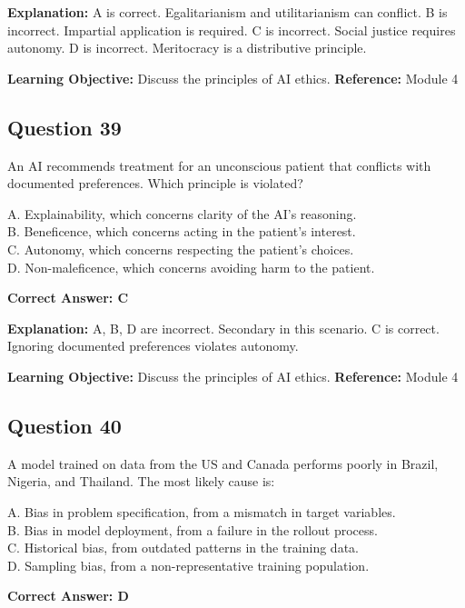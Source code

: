 \documentclass[11pt]{article}
\begin{document}
	\textbf{Explanation:}
	A is correct. Egalitarianism and utilitarianism can conflict.
	B is incorrect. Impartial application is required.
	C is incorrect. Social justice requires autonomy.
	D is incorrect. Meritocracy is a distributive principle.
	
	\textbf{Learning Objective:} Discuss the principles of AI ethics.
	\textbf{Reference:} Module 4
	
	\subsection*{Question 39}
	An AI recommends treatment for an unconscious patient that conflicts
	with documented preferences. Which principle is violated?
	
	A. Explainability, which concerns clarity of the AI's reasoning.\\
	B. Beneficence, which concerns acting in the patient's interest.\\
	C. Autonomy, which concerns respecting the patient's choices.\\
	D. Non-maleficence, which concerns avoiding harm to the patient.
	
	\vspace{0.4em}
	\textbf{Correct Answer: C}
	
	\textbf{Explanation:}
	A, B, D are incorrect. Secondary in this scenario.
	C is correct. Ignoring documented preferences violates autonomy.
	
	\textbf{Learning Objective:} Discuss the principles of AI ethics.
	\textbf{Reference:} Module 4
	
	\subsection*{Question 40}
	A model trained on data from the US and Canada performs poorly in
	Brazil, Nigeria, and Thailand. The most likely cause is:
	
	A. Bias in problem specification, from a mismatch in target variables.\\
	B. Bias in model deployment, from a failure in the rollout process.\\
	C. Historical bias, from outdated patterns in the training data.\\
	D. Sampling bias, from a non-representative training population.
	
	\vspace{0.4em}
	\textbf{Correct Answer: D}
	
\end{document}
